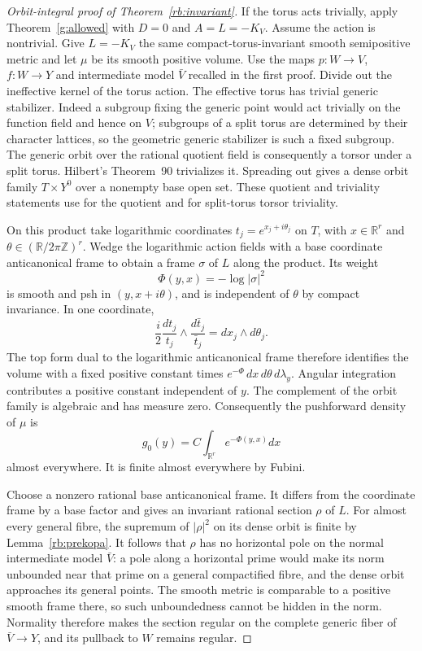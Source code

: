 \begin{proof}[Orbit-integral proof of Theorem~\ref{rb:invariant}]
If the torus acts trivially, apply Theorem~\ref{g:allowed} with
$D=0$ and $A=L=-K_V$. Assume the action is nontrivial.
Give $L=-K_V$ the same compact-torus-invariant smooth semipositive
metric and let $\mu$ be its smooth positive volume. Use the maps
$p:W\to V$, $f:W\to Y$ and intermediate model $\bar V$ recalled
in the first proof.  Divide out the
ineffective kernel of the torus action.  The effective torus has
trivial generic stabilizer.  Indeed a subgroup fixing the generic
point would act trivially on the function field and hence on $V$;
subgroups of a split torus are determined by their character lattices,
so the geometric generic stabilizer is such a fixed subgroup.
The generic orbit over the rational quotient field is consequently
a torsor under a split torus.  Hilbert's Theorem~90 trivializes it.
Spreading out gives a dense orbit family $T\times Y^0$ over a nonempty
base open set.  These quotient and triviality statements use
\cite{Rosenlicht1956,BellGhiocaReichstein2017} for the quotient and
\cite[Corollary~3.47 and Proposition~3.50]{MilneAlgebraicGroups2017}
for split-torus torsor triviality.

On this product take logarithmic coordinates
$t_j=e^{x_j+i\theta_j}$ on $T$, with $x\in\mathbb R^r$ and
$\theta\in(\mathbb R/2\pi\mathbb Z)^r$.  Wedge the logarithmic action fields
with a base coordinate anticanonical frame to obtain a frame $\sigma$
of $L$ along the product.  Its weight
\[
                  \Phi(y,x)=-\log|\sigma|^2
\]
is smooth and psh in $(y,x+i\theta)$, and is independent of $\theta$
by compact invariance.  In one coordinate,
\[
 \frac{i}{2}\frac{dt_j}{t_j}\wedge
             \frac{d\bar t_j}{\bar t_j}=dx_j\wedge d\theta_j.
\]
The top form dual to the logarithmic anticanonical frame therefore
identifies the volume with a fixed positive constant times
$e^{-\Phi}\,dx\,d\theta\,d\lambda_y$. Angular integration contributes
a positive constant independent of $y$.
The complement of the orbit family is algebraic and has measure zero.
Consequently the pushforward density of $\mu$ is
\[
                  g_0(y)=C\int_{\mathbb R^r}e^{-\Phi(y,x)}dx
\]
almost everywhere.  It is finite almost everywhere by Fubini.

Choose a nonzero rational base anticanonical frame.  It differs from
the coordinate frame by a base factor and gives an invariant rational
section $\rho$ of $L$.  For almost every general fibre, the supremum of
$|\rho|^2$ on its dense orbit is finite by Lemma~\ref{rb:prekopa}.
It follows that $\rho$ has no horizontal pole on the normal intermediate model $\bar V$:
a pole along a horizontal prime would make its norm unbounded near
that prime on a general compactified fibre, and the dense orbit
approaches its general points.  The smooth metric is comparable to a
positive smooth frame there, so such unboundedness cannot be hidden
in the norm. Normality therefore makes the section regular on the
complete generic fiber of \(\bar V\to Y\), and its pullback to \(W\)
remains regular.


\end{proof}
